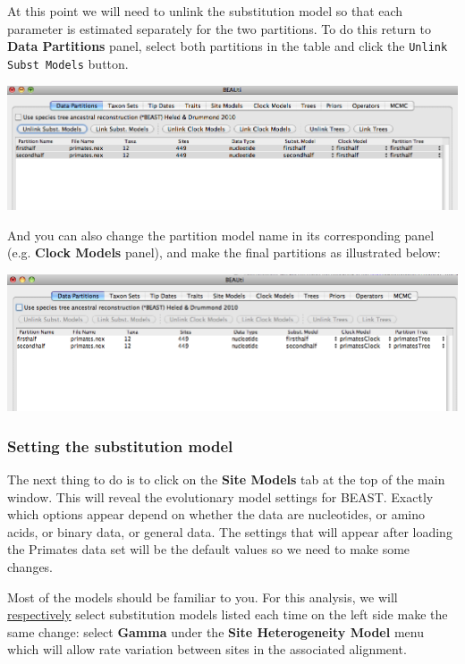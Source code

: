 \documentclass[12pt]{article}
\begin{document}
At this point we will need to unlink the substitution model so that each parameter is estimated separately for the two partitions. To do this return to {\bf Data Partitions} panel, select both partitions in the table and click the \texttt{Unlink Subst Models} button. 

\medskip{}

\includegraphics[scale=0.4]{figures/BEAUti_Unlink}

\medskip{}

And you can also change the partition model name in its corresponding panel (e.g. {\bf Clock Models}  panel), and make the final partitions as illustrated below:

\medskip{}

\includegraphics[scale=0.4]{figures/BEAUti_DataPartitions_final}

\medskip{}



\subsubsection*{Setting the substitution model}

The next thing to do is to click on the {\bf Site Models} tab at the top of the
main window. This will reveal the evolutionary model settings for
BEAST. Exactly which options appear depend on whether the data are
nucleotides, or amino acids, or binary data, or general data.
The settings that will appear after loading the Primates data set will
be the default values so we need to make some changes. 

Most of the models should be familiar to you. For this analysis, we
will \underline{respectively} select substitution models listed each time on the 
left side make the same change: select \textbf{Gamma} under the 
\textbf{Site Heterogeneity Model} menu which will allow rate variation 
between sites in the associated alignment. 
\end{document}
